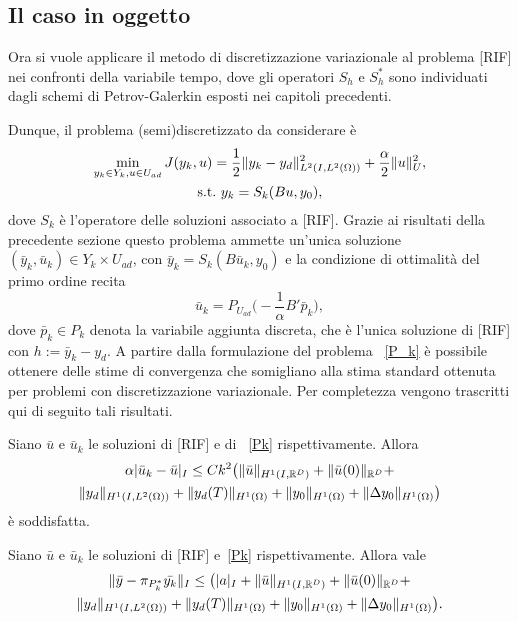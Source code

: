 \subsection{Il caso in oggetto}

Ora si vuole applicare il metodo di discretizzazione variazionale al problema [RIF] nei confronti della variabile tempo, dove gli operatori $ S_h $ e $ S^*_h $ sono individuati dagli schemi di Petrov-Galerkin esposti nei capitoli precedenti.

Dunque, il problema (semi)discretizzato da considerare è
\begin{gather}
\label{Pk}
\min_{y_k\in Y_k, u\in U_{ad}} J(y_k,u)=\frac{1}{2}\lVert y_k-y_d\rVert^2_{L^2(I,L^2(\Omega))} + \frac{\alpha}{2}\lVert u\rVert^2_U, \\
\text{s.t.} \ y_k=S_k(Bu,y_0),
\end{gather}
dove $ S_k $ è l'operatore delle soluzioni associato a [RIF]. Grazie ai risultati della precedente sezione questo problema ammette un'unica soluzione $ (\bar{y}_k, \bar{u}_k)\in Y_k\times U_{ad} $, con $ \bar{y}_k=S_k(B\bar{u}_k,y_0) $ e la condizione di ottimalità del primo ordine recita
\begin{equation}
\label{cnott}
\bar{u}_k=P_{U_{ad}}\big( -\frac{1}{\alpha}B'\bar{p}_k\big),
\end{equation}
dove $ \bar{p}_k\in P_k $ denota la variabile aggiunta discreta, che è l'unica soluzione di [RIF] con $ h:=\bar{y}_k-y_d $.
A partire dalla formulazione del problema ~\eqref{P_k} è possibile ottenere delle stime di convergenza che somigliano alla stima standard ottenuta per problemi con discretizzazione variazionale. Per completezza vengono trascritti qui di seguito tali risultati.
\begin{teorema}
\label{convu}

Siano $ \bar{u} $ e $ \bar{u}_k $ le soluzioni di [RIF]  e di ~\eqref{Pk} rispettivamente. Allora
\begin{multline} 
\alpha \lvert \bar{u}_k-\bar{u}\rvert_I\le Ck^2\big( \lVert\bar{u}\rVert_{H^1(I,\mathbb{R}^D)} + \lVert\bar{u}(0)\rVert_{\mathbb{R}^D} + \\
\lVert y_d\rVert_{H^1(I,L^2(\Omega))} + \lVert y_d(T)\rVert_{H^1(\Omega)} + \lVert y_0\rVert_{H^1(\Omega)} + \lVert\Delta y_0\rVert_{H^1(\Omega)}\big)
\end{multline}
è soddisfatta.

\end{teorema}

\begin{teorema}
\label{convy}

Siano $ \bar{u} $ e $ \bar{u}_k $ le soluzioni di [RIF] e~\eqref{Pk} rispettivamente. Allora vale
\begin{multline}
\lVert\bar{y}-\pi_{P^*_k}\bar{y_k}\rVert_I\le\big( \lvert a\rvert_I + \lVert\bar{u}\rVert_{H^1(I,\mathbb{R}^D)} + \lVert\bar{u}(0)\rVert_{\mathbb{R}^D} + \\ 
\lVert y_d\rVert_{H^1(I,L^2(\Omega))} + \lVert y_d(T)\rVert_{H^1(\Omega)} + \lVert y_0\rVert_{H^1(\Omega)} + \lVert\Delta y_0\rVert_{H^1(\Omega)}\big).
\end{multline}

\end{teorema}  

